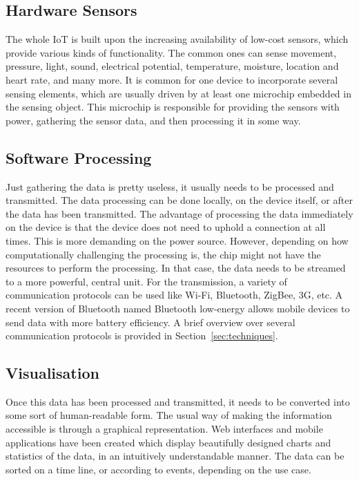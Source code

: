 \subsection{Hardware Sensors}
\label{sec:hardwareSensors}
The whole IoT is built upon the increasing availability of low-cost sensors, which provide various kinds of functionality.
The common ones can sense movement, pressure, light, sound, electrical potential, temperature, moisture, location and heart rate, and many more.
It is common for one device to incorporate several sensing elements, which are usually driven by at least one microchip embedded in the sensing object.
This microchip is responsible for providing the sensors with power, gathering the sensor data, and then processing it in some way.

\subsection{Software Processing} 
\label{sec:softwareProcessing}
Just gathering the data is pretty useless, it usually needs to be processed and transmitted. 
The data processing can be done locally, on the device itself, or after the data has been transmitted. 
The advantage of processing the data immediately on the device is that the device does not need to uphold a connection at all times. 
This is more demanding on the power source. 
However, depending on how computationally challenging the processing is, the chip might not have the resources to perform the processing. 
In that case, the data needs to be streamed to a more powerful, central unit. 
For the transmission, a variety of communication protocols can be used like Wi-Fi, Bluetooth, ZigBee, 3G, etc. 
A recent version of Bluetooth named Bluetooth low-energy allows mobile devices to send data with more battery efficiency. A brief overview over several communication protocols is provided in Section~\ref{sec:techniques}.

\subsection{Visualisation}
\label{sec:visualisation}
Once this data has been processed and transmitted, it needs to be converted into some sort of human-readable form. The usual way of making the information accessible is through a graphical representation. 
Web interfaces and mobile applications have been created which display beautifully designed charts and statistics of the data, in an intuitively understandable manner. 
The data can be sorted on a time line, or according to events, depending on the use case.

